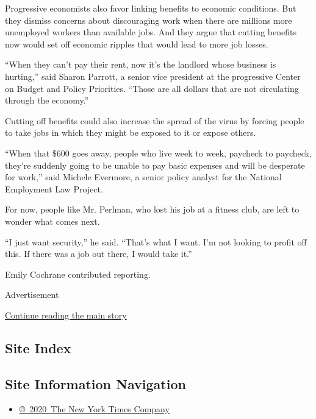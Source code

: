 Progressive economists also favor linking benefits to economic
conditions. But they dismiss concerns about discouraging work when there
are millions more unemployed workers than available jobs. And they argue
that cutting benefits now would set off economic ripples that would lead
to more job losses.

``When they can't pay their rent, now it's the landlord whose business
is hurting,'' said Sharon Parrott, a senior vice president at the
progressive Center on Budget and Policy Priorities. ``Those are all
dollars that are not circulating through the economy.''

Cutting off benefits could also increase the spread of the virus by
forcing people to take jobs in which they might be exposed to it or
expose others.

``When that \$600 goes away, people who live week to week, paycheck to
paycheck, they're suddenly going to be unable to pay basic expenses and
will be desperate for work,'' said Michele Evermore, a senior policy
analyst for the National Employment Law Project.

For now, people like Mr. Perlman, who lost his job at a fitness club,
are left to wonder what comes next.

``I just want security,'' he said. ``That's what I want. I'm not looking
to profit off this. If there was a job out there, I would take it.''

Emily Cochrane contributed reporting.

Advertisement

\protect\hyperlink{after-bottom}{Continue reading the main story}

\hypertarget{site-index}{%
\subsection{Site Index}\label{site-index}}

\hypertarget{site-information-navigation}{%
\subsection{Site Information
Navigation}\label{site-information-navigation}}

\begin{itemize}
\tightlist
\item
  \href{https://help.nytimes3xbfgragh.onion/hc/en-us/articles/115014792127-Copyright-notice}{©~2020~The
  New York Times Company}
\end{itemize}

